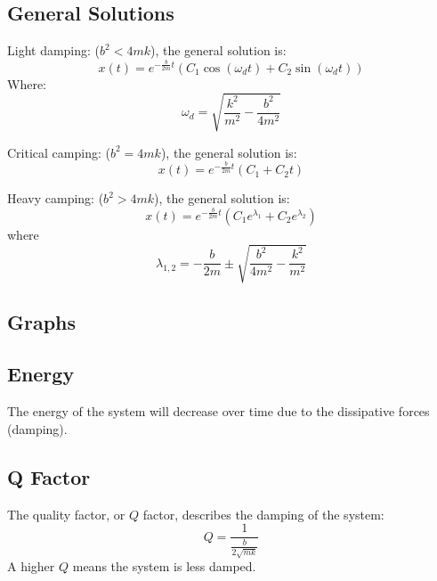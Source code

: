\documentclass[12pt,a4paper]{article}
\begin{document}
	\subsection*{General Solutions}
	\indent Light damping: (\( b^2 < 4mk \)), the general solution is:\\
	\[
	x(t) = e^{-\frac{b}{2m}t} \left( C_1 \cos(\omega_d t) + C_2 \sin(\omega_d t) \right)
	\]
	Where:
	\[
	\omega_d = \sqrt{\frac{k^2}{m^2} - \frac{b^2}{4m^2}}
	\]
	
	Critical camping: (\( b^2 = 4mk \)), the general solution is:\\
	\[
	x(t) = e^{-\frac{b}{2m}t} \left( C_1 + C_2 t \right)
	\]
	
	Heavy camping: (\( b^2 > 4mk \)), the general solution is:\\
	\[
	x(t) = e^{-\frac{b}{2m}t} \left( C_1 e^{\lambda_1} + C_2 e^{\lambda_2} \right)
	\]
	where \[ \lambda_{1,2} = -\frac{b}{2m} \pm \sqrt{\frac{b^2}{4m^2} - \frac{k^2}{m^2}} \]
	\subsection*{Graphs}
	
	\subsection*{Energy}
	The energy of the system will decrease over time due to the dissipative forces (damping).
	
	\subsection*{Q Factor}
	The quality factor, or \( Q \) factor, describes the damping of the system:
	\[
	Q = \frac{1}{\frac{b}{2\sqrt{mk}}}
	\]
	A higher \( Q \) means the system is less damped.
	
\end{document}
